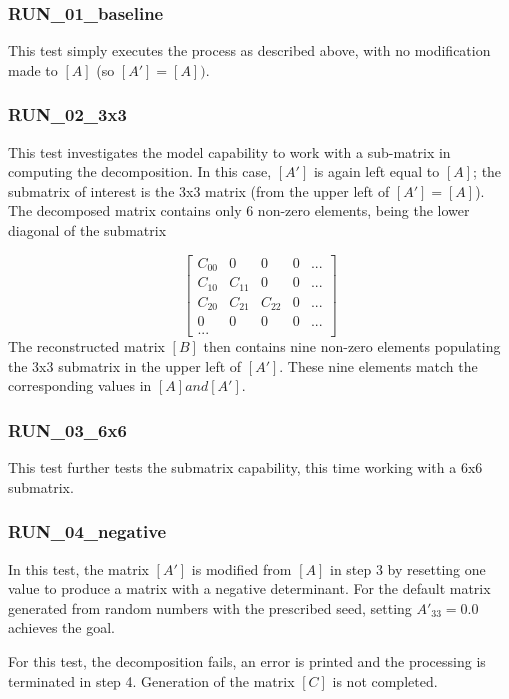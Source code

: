 \documentclass[11pt,fleqn]{report}
\begin{document}
\subsubsection{RUN\_01\_baseline}
This test simply executes the process as described above, with no modification
made to $[A]$ (so $[A'] = [A])$.

\subsubsection{RUN\_02\_3x3}
This test investigates the model capability to work with a sub-matrix in
computing the decomposition. In this case, $[A']$ is again left equal to
$[A]$; the submatrix of interest is the 3x3 matrix (from the upper left of
$[A'] = [A]$). The decomposed matrix contains only 6 non-zero elements, being
the lower diagonal of the submatrix

\begin{equation*}
 \begin{bmatrix}
 C_{00} & 0& 0& 0 & ... \\
 C_{10} & C_{11} & 0& 0 & ... \\
 C_{20} & C_{21} & C_{22} & 0 & ... \\
 0&0 & 0& 0 & ... \\
 ...
 \end{bmatrix}
\end{equation*}
The reconstructed matrix $[B]$ then contains nine non-zero elements populating
the 3x3 submatrix in the upper left of $[A']$.
These nine elements match the corresponding values in $[A] and [A']$.

\subsubsection{RUN\_03\_6x6}
This test further tests the submatrix capability, this time working with a 6x6
submatrix.

\subsubsection{RUN\_04\_negative}
In this test, the matrix $[A']$ is modified from $[A]$ in step 3
by resetting one value
to produce a matrix with a negative determinant. For the default matrix
generated from random numbers with the prescribed seed, setting
$A'_{33} = 0.0$ achieves the goal.

For this test, the decomposition fails, an error is printed and the processing
is terminated in step 4. Generation of the matrix $[C]$ is not completed.
\end{document}
